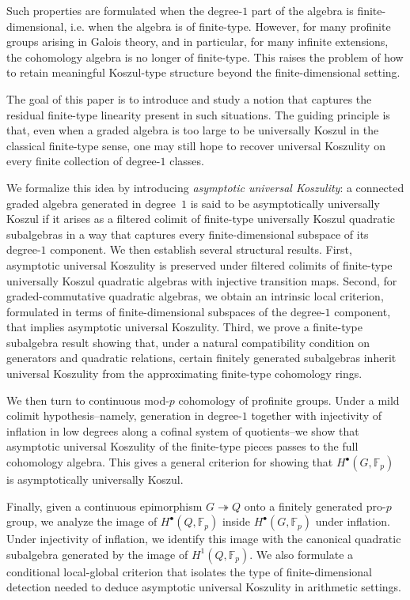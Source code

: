 \documentclass[11pt]{amsart}
\numberwithin{equation}{section}
\theoremstyle{definition}
\begin{document}
	Such properties are formulated when the degree-$1$ part of the algebra is finite-dimensional, i.e. when the algebra is of finite-type. However, for many profinite groups arising in Galois theory, and in particular, for many infinite extensions, the cohomology algebra is no longer of finite-type. This raises the problem of how to retain meaningful Koszul-type structure beyond the finite-dimensional setting. 
	
	The goal of this paper is to introduce and study a notion that captures the residual finite-type linearity present in such situations. The guiding principle is that, even when a graded algebra is too large to be universally Koszul in the classical finite-type sense, one may still hope to recover universal Koszulity on every finite collection of degree-$1$ classes. 
	
	
	We formalize this idea by introducing \emph{asymptotic universal Koszulity}: a connected graded algebra generated in degree~$1$ is said to be asymptotically universally Koszul if it arises as a filtered colimit of finite-type universally Koszul quadratic subalgebras in a way that captures every finite-dimensional subspace of its degree-$1$ component. We then establish several structural results. First, asymptotic universal Koszulity is preserved under filtered colimits of finite-type universally Koszul quadratic algebras with injective transition maps. Second, for graded-commutative quadratic algebras, we obtain an intrinsic local criterion, formulated in terms of finite-dimensional subspaces of the degree-$1$ component, that implies asymptotic universal Koszulity. Third, we prove a finite-type subalgebra result showing that, under a natural compatibility condition on generators and quadratic relations, certain finitely generated subalgebras inherit universal Koszulity from the approximating finite-type cohomology rings.
	
	We then turn to continuous mod-$p$ cohomology of profinite groups. Under a mild colimit hypothesis--namely, generation in degree-$1$ together with injectivity of inflation in low degrees along a cofinal system of quotients--we show that asymptotic universal Koszulity of the finite-type pieces passes to the full cohomology algebra. This gives a general criterion for showing that \(H^\bullet(G,\mathbb F_p)\) is asymptotically universally Koszul.
	
	
	Finally, given a continuous epimorphism \(G \twoheadrightarrow Q\) onto a finitely generated pro-$p$ group, we analyze the image of \(H^\bullet(Q, \mathbb{F}_p)\) inside \(H^\bullet(G, \mathbb{F}_p)\) under inflation. Under injectivity of inflation, we identify this image with the canonical quadratic subalgebra generated by the image of \(H^1(Q, \mathbb{F}_p)\). We also formulate a conditional local-global criterion that isolates the type of finite-dimensional detection needed to deduce asymptotic universal Koszulity in arithmetic settings.
	
\end{document}
